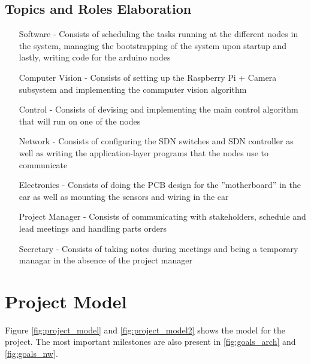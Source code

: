 \documentclass[11pt, titlepage]{article} %
\begin{document}
\subsection{Topics and Roles Elaboration}
\begin{itemize}
\item[Software] - Consists of scheduling the tasks running at the different
    nodes in the system, managing the bootstrapping of the system upon
    startup and lastly, writing code for the arduino nodes
\item[Computer Vision] - Consists of setting up the Raspberry Pi + Camera
    subsystem and implementing the commputer vision algorithm
\item[Control] - Consists of devising and implementing the main
    control algorithm that will run on one of the nodes
\item[Network] - Consists of configuring the SDN switches and SDN controller
    as well as writing the application-layer programs that the nodes
    use to communicate
\item[Electronics] - Consists of doing the PCB design for the
    ''motherboard'' in the car as well as mounting the sensors and 
    wiring in the car
\item[Project Manager] - Consists of communicating with stakeholders, 
    schedule and lead meetings and handling parts orders
\item[Secretary] - Consists of taking notes during meetings and
    being a temporary managar in the absence of the project manager
\end{itemize}

\section{Project Model}
Figure \ref{fig:project_model} and \ref{fig:project_model2} shows the
model for the project. The most important milestones are also present in
\ref{fig:goals_arch} and \ref{fig:goals_nw}.
\end{document}
